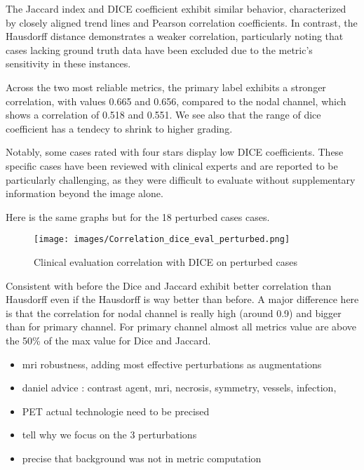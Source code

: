 The Jaccard index and DICE coefficient exhibit similar behavior, characterized by closely aligned trend lines and Pearson correlation coefficients. In contrast, the Hausdorff distance demonstrates a weaker correlation, particularly noting that cases lacking ground truth data have been excluded due to the metric's sensitivity in these instances.

Across the two most reliable metrics, the primary label exhibits a stronger correlation, with values 0.665 and 0.656, compared to the nodal channel, which shows a correlation of 0.518 and 0.551.
We see also that the range of dice coefficient has a tendecy to shrink to higher grading.

Notably, some cases rated with four stars display low DICE coefficients. These specific cases have been reviewed with clinical experts and are reported to be particularly challenging, as they were difficult to evaluate without supplementary information beyond the image alone.
\newpage 

Here is the same graphs but for the 18 perturbed cases cases.
\begin{figure}[ht]
    \centering
    \texttt{[image: images/Correlation\_dice\_eval\_perturbed.png]}
    \caption{Clinical evaluation correlation with DICE on perturbed cases}
    \label{fig:three_subfigures}
\end{figure}

Consistent with before the Dice and Jaccard exhibit better correlation than Hausdorff even if the Hausdorff is way better than before.
A major difference here is that the correlation for nodal channel is really high (around 0.9) and bigger than for primary channel.
For primary channel almost all metrics value are above the 50\% of the max value for Dice and Jaccard.
\begin{itemize}
    \item mri robustness, adding most effective perturbations as augmentations
    \item daniel advice : contrast agent, mri, necrosis, symmetry, vessels, infection, 
    \item PET actual technologie need to be precised
    \item tell why we focus on the 3 perturbations
    \item precise that background was not in metric computation
\end{itemize}